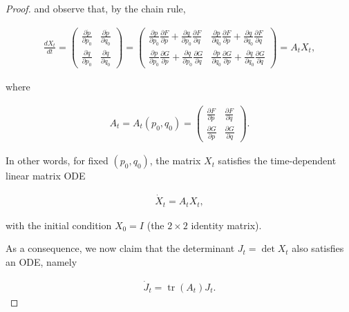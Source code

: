 \documentclass[11pt]{report}
\theoremstyle{plain}
\theoremstyle{definition}
\begin{document}
\begin{proof}
and observe that, by the chain rule,

\begin{align*}
\frac{dX_t}{dt} =
\left(\begin{array}{cc}
\frac{\partial \dot{p}}{\partial p_0} & \frac{\partial \dot{p}}{\partial q_0} \\ \frac{\partial \dot{q}}{\partial p_0} & \frac{\partial \dot{q}}{\partial q_0}
\end{array}\right) =
\left(\begin{array}{cc}
\frac{\partial p}{\partial p_0} \frac{\partial F}{\partial p} + \frac{\partial q}{\partial p_0} \frac{\partial F}{\partial q} & \frac{\partial p}{\partial q_0} \frac{\partial F}{\partial p} + \frac{\partial q}{\partial q_0} \frac{\partial F}{\partial q} \\
\frac{\partial p}{\partial p_0} \frac{\partial G}{\partial p} + \frac{\partial q}{\partial p_0} \frac{\partial G}{\partial q} & \frac{\partial p}{\partial q_0} \frac{\partial G}{\partial p} + \frac{\partial q}{\partial q_0} \frac{\partial G}{\partial q}
\end{array}\right)
= A_t X_t,
\end{align*}

where

\begin{align*}
A_t = A_t(p_0,q_0) = \left(\begin{array}{cc} \frac{\partial F}{\partial p} & \frac{\partial F}{\partial q} \\ \frac{\partial G}{\partial p} & \frac{\partial G}{\partial q} \end{array}\right).
\end{align*}

In other words, for fixed $(p_0,q_0)$, the matrix
$X_t$ satisfies the time-dependent linear matrix ODE

\begin{align*}
\dot{X}_t = A_t X_t,
\end{align*}

with the initial condition $X_0 = I$ (the $2\times2$
identity matrix).

As a consequence, we now claim that the determinant
$J_t = \det X_t$ also satisfies an ODE, namely

\begin{equation*} \tag{18}\label{eq:liou-jac-ode}
\begin{split}
\dot{J}_t = \operatorname{tr}(A_t) J_t.
\end{split}
\end{equation*}


\end{proof}
\end{document}
